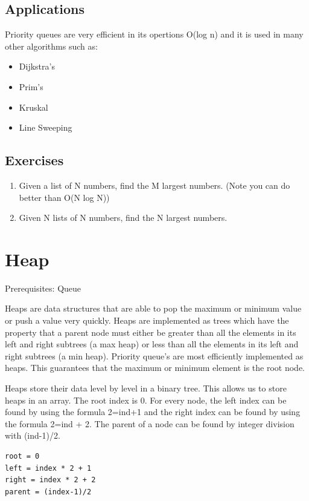 \documentclass[11pt,oneside]{book}
\begin{document}
\subsection{Applications}

Priority queues are very efficient in its opertions O(log n) and it is used in many other algorithms such as:

\begin{itemize}
\item Dijkstra's
\item Prim's
\item Kruskal
\item Line Sweeping
\end{itemize}

\subsection{Exercises}

\begin{enumerate}
\item Given a list of N numbers, find the M largest numbers. (Note you can do better than O(N log N))
\item Given N lists of N numbers, find the N largest numbers.
\end{enumerate}
\section{Heap}

Prerequisites: Queue



Heaps are data structures that are able to pop the maximum or minimum value or push a value very quickly. Heaps are implemented as trees which have the property that a parent node must either be greater than all the elements in its left and right subtrees (a max heap) or less than all the elements in its left and right subtrees (a min heap). Priority queue's are most efficiently implemented as heaps. This guarantees that the maximum or minimum element is the root node.

Heaps store their data level by level in a binary tree. This allows us to store heaps in an array. The root index is 0. For every node, the left index can be found by using the formula 2=ind+1 and the right index can be found by using the formula 2=ind + 2. The parent of a node can be found by integer division with (ind-1)/2.

\begin{lstlisting}
root = 0
left = index * 2 + 1
right = index * 2 + 2
parent = (index-1)/2
\end{lstlisting}
\end{document}
